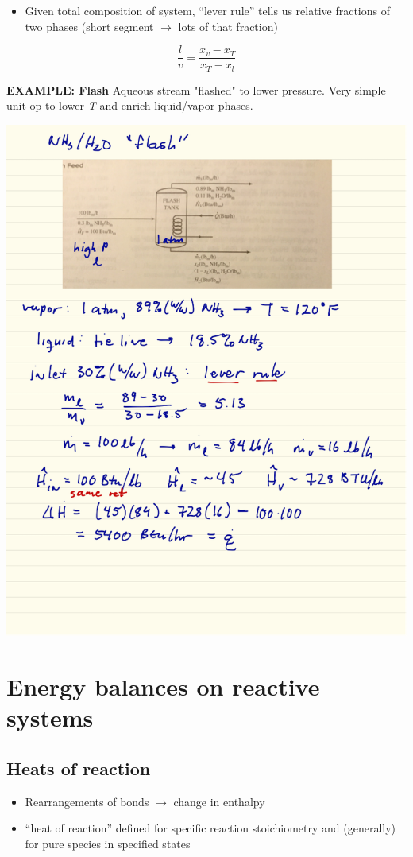 \documentclass[11pt]{article}
\begin{document}
\begin{itemize}
\item Given total composition of system, ``lever rule'' tells us relative fractions of two phases (short segment $\to$ lots of that fraction)
\end{itemize}

\[ \frac{l}{v} = \frac{x_{v} - x_{T}}{x_{T}-x_{l}} \]

\begin{framed}
\noindent \textbf{EXAMPLE: Flash} Aqueous  stream "flashed" to lower pressure. Very simple unit op to lower \textit{T} and enrich liquid/vapor phases.
\end{framed}

\includegraphics[width=.9\linewidth]{./figs/Flash.png}


\section{Energy balances on reactive systems}
\label{sec-11}
\subsection{Heats of reaction}
\label{sec-11-1}
\begin{itemize}
\item Rearrangements of bonds $\to$ change in enthalpy
\item ``heat of reaction'' defined for specific reaction stoichiometry and (generally) for pure species in specified states
\end{itemize}
\end{document}
